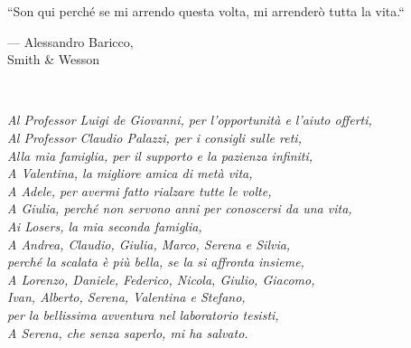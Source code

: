 
\begin{dedication} 
\footnotesize	
\epigraph{``Son qui perché se mi arrendo questa volta, mi arrenderò tutta la vita.``}{--- \textup{Alessandro Baricco}, \\Smith \& Wesson}
~\\[0.7in]
\begin{flushright}
	\textit{
	Al Professor Luigi de Giovanni, per l'opportunità e l'aiuto offerti, \\
	Al Professor Claudio Palazzi, per i consigli sulle reti, \\
	Alla mia famiglia, per il supporto e la pazienza infiniti,\\
	A Valentina, la migliore amica di metà vita,\\
	A Adele, per avermi fatto rialzare tutte le volte, \\
	A Giulia, perché non servono anni per conoscersi da una vita, \\
	Ai Losers, la mia seconda famiglia, \\
	A Andrea, Claudio, Giulia, Marco, Serena e Silvia,\\ perché la scalata è più bella, se la si affronta insieme, \\
	A Lorenzo, Daniele, Federico, Nicola, Giulio, Giacomo, \\Ivan, Alberto, Serena, Valentina e Stefano, \\per la bellissima avventura nel laboratorio tesisti,
	\\[0.5in]
	A Serena, che senza saperlo, mi ha salvato.\\
	}
	
	

\end{flushright}


\end{dedication}

